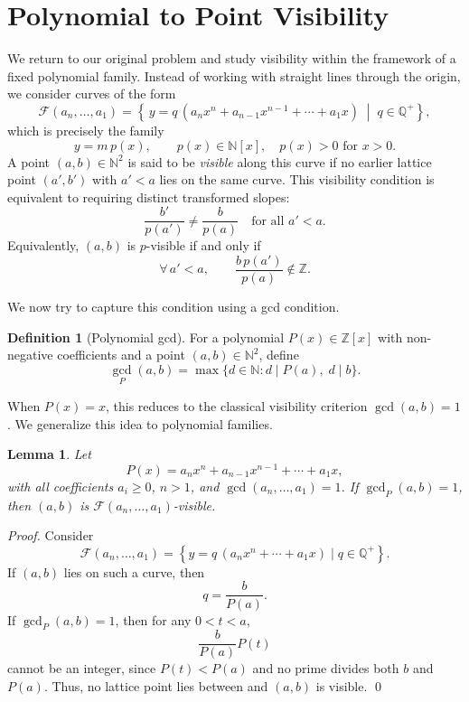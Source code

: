 \documentclass[12pt, reqno]{amsart}
\newtheorem{lemma}[theorem]{Lemma}
\theoremstyle{definition}
\newtheorem{definition}[theorem]{Definition}
\theoremstyle{remark}
\numberwithin{equation}{section}
\begin{document}
\section{Polynomial to Point Visibility}
We return to our original problem and study visibility within the framework of a fixed polynomial family. Instead of working with straight lines through the origin, we consider curves of the form  
\[
\mathcal{F}(a_n,\dots,a_1)
=
\left\{
\, y = q\,(a_nx^n + a_{n-1}x^{n-1} + \cdots + a_1x)
\;\middle|\; q \in \mathbb{Q}^+
\right\},
\]
which is precisely the family
\[
y = m\,p(x),
\qquad
p(x) \in \mathbb{N}[x], \quad p(x) > 0 \text{ for } x>0.
\]
 A point \( (a,b)\in\mathbb{N}^2 \) is said to be \emph{visible} along this curve if no earlier lattice point \( (a',b') \) with \( a'<a \) lies on the same curve.  
This visibility condition is equivalent to requiring distinct transformed slopes:
\[
\frac{b'}{p(a')} \neq \frac{b}{p(a)} \quad \text{for all } a'<a.
\]
Equivalently, \( (a,b) \) is \(p\)-visible if and only if
\[
\forall\, a'<a,\qquad \frac{b\,p(a')}{p(a)}\notin\mathbb{Z}.
\]

We now try to capture this condition using a gcd condition.
\begin{definition}[Polynomial gcd]
For a polynomial \(P(x)\in\mathbb{Z}[x]\) with non-negative coefficients and a point \((a,b)\in\mathbb{N}^2\), define
\[
\gcd_{P}(a,b)
= \max\{d\in\mathbb{N}: d\mid P(a),\; d\mid b\}.
\]
\end{definition}

When \(P(x)=x\), this reduces to the classical visibility criterion \(\gcd(a,b)=1\).  
We generalize this idea to polynomial families.

\begin{lemma}
Let 
\[
P(x)=a_nx^n+a_{n-1}x^{n-1}+\cdots+a_1x,
\]
with all coefficients \(a_i\ge0\), \(n>1\), and \(\gcd(a_n,\dots,a_1)=1\).  
If \(\gcd_P(a,b)=1\), then \((a,b)\) is \(\mathcal{F}(a_n,\dots,a_1)\)-visible.
\end{lemma}

\begin{proof}
Consider 
\[
\mathcal{F}(a_n,\dots,a_1)
=\left\{y=q\,(a_nx^n+\cdots+a_1x)\mid q\in\mathbb{Q}^+\right\}.
\]
If \((a,b)\) lies on such a curve, then 
\[
q=\frac{b}{P(a)}.
\]
If \(\gcd_P(a,b)=1\), then for any \(0<t<a\),
\[
\frac{b}{P(a)}P(t)
\]
cannot be an integer, since \(P(t)<P(a)\) and no prime divides both \(b\) and \(P(a)\).  
Thus, no lattice point lies between and \((a,b)\) is visible. \qed
\end{proof}
\end{document}
